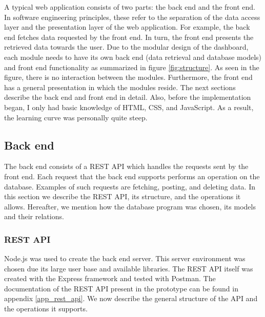     A typical web application consists of two parts: the back end and the front end. In software engineering principles, these refer to the separation of the data access layer and the presentation layer of the web application. For example, the back end fetches data requested by the front end. In turn, the front end presents the retrieved data towards the user. Due to the modular design of the dashboard, each module needs to have its own back end (data retrieval and database models) and front end functionality as summarized in figure \ref{fig:structure}.  As seen in the figure, there is no interaction between the modules. Furthermore, the front end has a general presentation in which the modules reside. The next sections describe the back end and front end in detail. Also, before the implementation began, I only had basic knowledge of HTML, CSS, and JavaScript. As a result, the learning curve was personally quite steep.

    \subsection{Back end}

    The back end consists of a REST API which handles the requests sent by the front end. Each request that the back end supports performs an operation on the database. Examples of such requests are fetching, posting, and deleting data. In this section we describe the REST API, its structure, and the operations it allows. Hereafter, we mention how the database program was chosen, its models and their relations.

        \subsubsection{REST API}

        Node.js was used to create the back end server. This server environment was chosen due its large user base and available libraries. The REST API itself was created with the Express framework and tested with Postman. The documentation of the REST API present in the prototype can be found in appendix \ref{app_rest_api}. We now describe the general structure of the API and the operations it supports.

